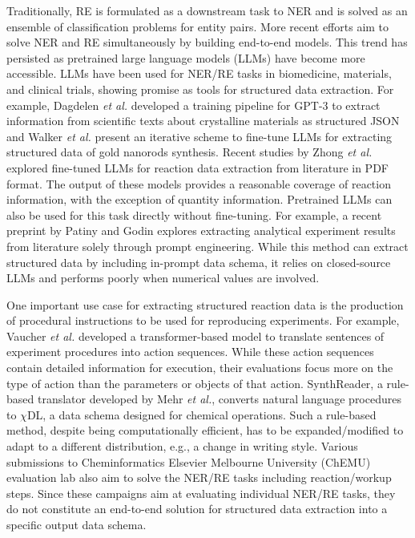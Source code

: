 \documentclass[11pt]{article}
\begin{document}
    Traditionally, RE is formulated as a downstream task to NER and is solved as an ensemble of classification problems for entity pairs.\cite{hoffmann_knowledge-based_2011,riedel_modeling_2010} More recent efforts aim to solve NER and RE simultaneously by building end-to-end models.\cite{zeng_extracting_2018, miwa_end--end_2016, huguet_cabot_rebel_2021, eberts_end--end_2021} This trend has persisted as pretrained large language models (LLMs) have become more accessible. LLMs have been used for NER/RE tasks in biomedicine,\cite{luo_biogpt_2022} materials,\cite{ansari_agent-based_2023} and clinical trials,\cite{datta_autocriteria_2024} showing promise as tools for structured data extraction. For example, Dagdelen \textit{et al.} developed a training pipeline for GPT-3 to extract information from scientific texts about crystalline materials as structured JSON\cite{dagdelen_structured_2024} and Walker \textit{et al.} present an iterative scheme to fine-tune LLMs for extracting structured data of gold nanorods synthesis.\cite{walker_extracting_2023} Recent studies by Zhong \textit{et al.} explored fine-tuned LLMs for reaction data extraction from literature in PDF format.\cite{zhong-etal-2023-reactie, zhong-etal-2023-reaction} The output of these models provides a reasonable coverage of reaction information, with the exception of quantity information. Pretrained LLMs can also be used for this task directly without fine-tuning. For example, a recent preprint by Patiny and Godin explores extracting analytical experiment results from literature solely through prompt engineering.\cite{patiny_automatic_2023} While this method can extract structured data by including in-prompt data schema, it relies on closed-source LLMs and performs poorly when numerical values are involved.

    One important use case for extracting structured reaction data is the production of procedural instructions to be used for reproducing experiments. For example, Vaucher \textit{et al.} developed a transformer-based model to translate sentences of experiment procedures into action sequences.\cite{vaucher_automated_2020} While these action sequences contain detailed information for execution, their evaluations focus more on the type of action than the parameters or objects of that action. SynthReader,\cite{mehr_universal_2020} a rule-based translator developed by Mehr \textit{et al.}, converts natural language procedures to $\chi$DL, a data schema designed for chemical operations. Such a rule-based method, despite being computationally efficient, has to be expanded/modified to adapt to a different distribution, e.g., a change in writing style. Various submissions to Cheminformatics Elsevier Melbourne University (ChEMU) evaluation lab\cite{he_extended_2020, li_extended_2021, li_extended_2022} also aim to solve the NER/RE tasks including reaction/workup steps. Since these campaigns aim at evaluating individual NER/RE tasks, they do not constitute an end-to-end solution for structured data extraction into a specific output data schema.
\end{document}
